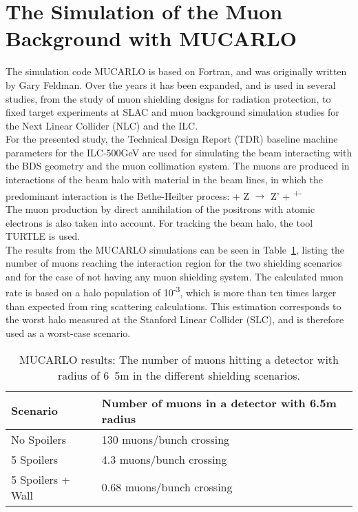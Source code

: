 \section{The Simulation of the Muon Background with MUCARLO}
\label{MUCARLO}

The simulation code MUCARLO\cite{MuonBkg_05TeV, MuonBkg_1TeV} is based on Fortran, and was originally written by Gary Feldman.
Over the years it has been expanded, and is used in several studies, from the study of muon shielding designs for radiation protection, to fixed target experiments at SLAC and muon background simulation studies for the Next Linear Collider (NLC) and the ILC\cite{MuonBkg_05TeV, MuonBkg_1TeV}.\\
For the presented study, the Technical Design Report (TDR) baseline machine parameters for the ILC-500GeV are used for simulating the beam interacting with the BDS geometry and the muon collimation system.
The muons are produced in interactions of the beam halo with material in the beam lines, in which the predominant interaction is the Bethe-Heilter process:
\textgamma + Z $\rightarrow$ Z' + \murm\textsuperscript{+}\murm\textsuperscript{-}\\
The muon production by direct annihilation of the positrons with atomic electrons is also taken into account.\cite[sec. 2]{Mucarlo}
For tracking the beam halo, the tool TURTLE\cite{Turtle} is used.\\
The results from the MUCARLO simulations can be seen in Table~\ref{tab:MuonRates}, listing the number of muons reaching the interaction region for the two shielding scenarios and for the case of not having any muon shielding system.
The calculated muon rate is based on a halo population of 10\textsuperscript{-3}, which is more than ten times larger than expected from ring scattering calculations.
This estimation corresponds to the worst halo measured at the Stanford Linear Collider (SLC), and is therefore used as a worst-case scenario.

\begin{table}
\caption{MUCARLO results: The number of muons hitting a detector with radius of \unit{6.5}{m} in the different shielding scenarios.}
\label{tab:MuonRates}
\centering
\begin{tabularx}{\textwidth}{ll}
\hline\hline
\textbf{Scenario} & \textbf{Number of muons in a detector with 6.5m radius}\\
\hline
\cline{1-2}
\hline
 No Spoilers & 130 muons/bunch crossing\\
 5 Spoilers& 4.3 muons/bunch crossing\\
 5 Spoilers + Wall & 0.68 muons/bunch crossing\\
\hline\hline
\end{tabularx}
\end{table}
